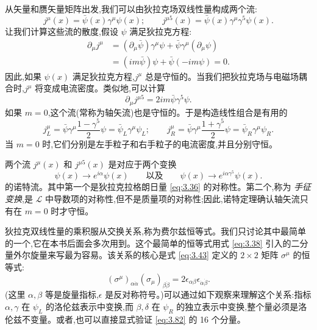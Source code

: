 从矢量和赝矢量矩阵出发,我们可以由狄拉克场双线性量构成两个流:
\begin{equation}
  j^\mu(x) = \bar{\psi}(x)\gamma^\mu\psi(x);\qquad
  j^{\mu 5}(x) = \bar{\psi}(x)\gamma^\mu\gamma^5\psi(x) .
  \label{eq:3.78}
\end{equation}
让我们计算这些流的散度,假设 $\psi$ 满足狄拉克方程:
\begin{align}
  \partial_\mu j^\mu &= (\partial_\mu\bar{\psi})\gamma^\mu\psi
    + \bar{\psi}\gamma^\mu(\partial_\mu\psi)\\
  &= (im\bar{\psi})\psi + \bar{\psi}(-im\psi) = 0 .
  \label{eq:3.79}
\end{align}
因此,如果 $\psi(x)$ 满足狄拉克方程,$j^\mu$ 总是守恒的。当我们把狄拉克场与电磁场耦合时,$j^\mu$ 将变成电流密度。类似地,可以计算
\begin{equation}
  \partial_\mu j^{\mu 5} = 2im\bar{\psi}\gamma^5\psi .
  \label{eq:3.80}
\end{equation}
如果 $m=0$,这个流(常称为轴矢流)也是守恒的。于是构造线性组合是有用的
\begin{equation}
  j_L^\mu = \bar{\psi}\gamma^\mu\frac{1-\gamma^5}{2}\psi
    = \bar{\psi}_L\gamma^\mu\psi_L;\qquad
  j_R^\mu = \bar{\psi}\gamma^\mu\frac{1+\gamma^5}{2}\psi
    = \bar{\psi}_R\gamma^\mu\psi_R .
  \label{eq:3.81}
\end{equation}
当 $m=0$ 时,它们分别是左手粒子和右手粒子的电流密度,并且分别守恒。

两个流 $j^\mu(x)$ 和 $j^{\mu 5}(x)$ 是对应于两个变换
\begin{equation}
  \psi(x) \to e^{i\alpha}\psi(x)
  \qquad\text{以及}\qquad
  \psi(x) \to e^{i\alpha\gamma^5}\psi(x) .
\end{equation}
的诺特流。其中第一个是狄拉克拉格朗日量 \eqref{eq:3.36} 的对称性。第二个,称为 \emph{手征变换},是 $\mathcal{L}$ 中导数项的对称性,但不是质量项的对称性;因此,诺特定理确认轴矢流只有在 $m=0$ 时才守恒。

狄拉克双线性量的乘积服从交换关系,称为费尔兹恒等式。我们只讨论其中最简单的一个,它在本书后面会多次用到。这个最简单的恒等式用式 \eqref{eq:3.38} 引入的二分量外尔旋量来写最为容易。该关系的核心是式 \eqref{eq:3.43} 定义的 $2\times2$ 矩阵 $\sigma^\mu$ 的恒等式:
\begin{equation}
  (\sigma^\mu)_{\alpha\dot{\alpha}}(\sigma_\mu)_{\beta\dot{\beta}}
    = 2\epsilon_{\alpha\beta}\epsilon_{\dot{\alpha}\dot{\beta}} .
  \label{eq:3.82}
\end{equation}
(这里 $\alpha, \beta$ 等是旋量指标,$\epsilon$ 是反对称符号。)可以通过如下观察来理解这个关系:指标 $\alpha, \gamma$ 在 $\psi_L$ 的洛伦兹表示中变换,而 $\beta, \delta$ 在 $\psi_R$ 的独立表示中变换,整个量必须是洛伦兹不变量。或者,也可以直接显式验证 \eqref{eq:3.82} 的 16 个分量。

